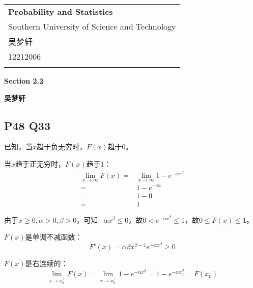 \documentclass[a4paper,12pt]{ctexart}
\begin{document}
\thispagestyle{empty} %

\begin{tabular}{p{15.5cm}}
{\large \bf Probability and Statistics} \\
Southern University of Science and Technology \\ 
吴梦轩 \\ 
12212006 \\
\hline
\\
\end{tabular}

\vspace*{0.3cm} %

\begin{center}
	{\Large \bf Section 2.2}
	\vspace{2mm}

	{\bf 吴梦轩}
		
\end{center}  

\vspace{0.4cm}

\subsection*{P48 Q33}

已知，当$x$趋于负无穷时，$F(x)$趋于0。

当$x$趋于正无穷时，$F(x)$趋于1：
\begin{align*}
	\lim_{x \rightarrow \infty} F(x) =& \lim_{x \rightarrow \infty} 1 - e^{-\alpha x^\beta}\\
	=& 1 - e^{-\infty}\\
	=& 1 - 0\\
	=& 1
\end{align*}

由于$x \geq 0,\alpha > 0,\beta > 0$，可知$-\alpha x^\beta \leq 0$，故$0 < e^{-\alpha x^\beta} \leq 1$，故$0 \leq F(x) \leq 1$。

$F(x)$是单调不减函数：
\begin{equation*}
	F'(x) = \alpha \beta x^{\beta - 1} e^{-\alpha x^\beta} \geq 0
\end{equation*}

$F(x)$是右连续的：
\begin{equation*}
	\lim_{x \rightarrow x_0^+} F(x) = \lim_{x \rightarrow x_0^+} 1 - e^{-\alpha x^\beta} = 1 - e^{-\alpha x_0^\beta} = F(x_0)
\end{equation*}
\end{document}
